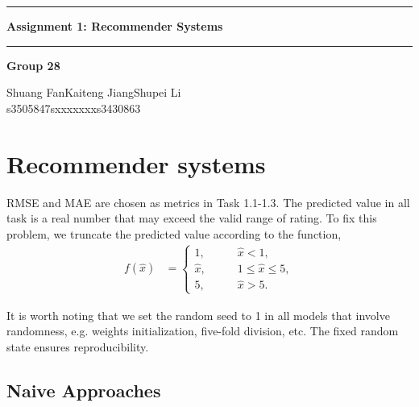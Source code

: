 \documentclass[12pt]{article}
\begin{document}
\noindent\rule{\textwidth}{1pt}
\begin{center}
    \LARGE \textbf{Assignment 1: Recommender Systems}
\end{center}
\noindent\rule{\textwidth}{0.5pt}
\begin{center}
    \textbf{Group 28}\par
    \vspace{0.3cm}
Shuang Fan\phantom{space}Kaiteng Jiang\phantom{space}Shupei Li\\
s3505847\phantom{spacespac}sxxxxxxx\phantom{spacespa}s3430863
\end{center}
\section{Recommender systems}
RMSE and MAE are chosen as metrics in Task 1.1-1.3. The predicted value in all task is a real number that may exceed the valid range of rating. To fix this problem, we truncate the predicted value according to the function,
\begin{align*}
    f(\hat{x}) &= 
    \begin{cases}
        1,\qquad &\hat{x} < 1,\\
        \hat{x},\qquad &1\leq \hat{x} \leq 5,\\
        5, \qquad &\hat{x} > 5.
    \end{cases}
\end{align*}
\par
It is worth noting that we set the random seed to 1 in all models that involve randomness, e.g. weights initialization, five-fold division, etc. The fixed random state ensures reproducibility.

\subsection{Naive Approaches}
\end{document}
